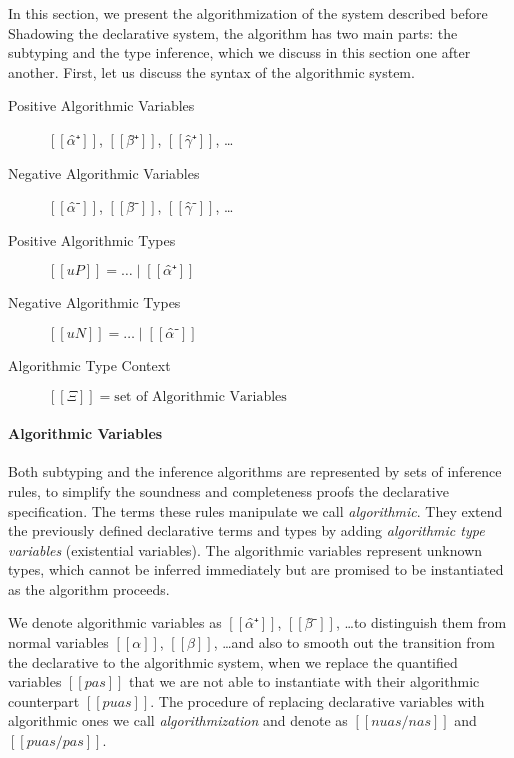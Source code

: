 




In this section, we present the algorithmization of the system described before
Shadowing the declarative system, the algorithm has two main parts: 
the subtyping and the type inference, which we discuss in this section one after another. 
First, let us discuss the syntax of the algorithmic system.

\begin{description}
        \item[Positive Algorithmic Variables] $[[α̂⁺]]$, $[[β̂⁺]]$, $[[γ̂⁺]]$, \dots 
        \item[Negative Algorithmic Variables] $[[α̂⁻]]$, $[[β̂⁻]]$, $[[γ̂⁻]]$, \dots
        \item[Positive Algorithmic Types] $[[uP]] = \dots \mid [[α̂⁺]]$  
        \item[Negative Algorithmic Types] $[[uN]] = \dots \mid [[α̂⁻]]$
        \item[Algorithmic Type Context] $[[Ξ]] = \text{set of Algorithmic Variables}$
\end{description}

\paragraph{Algorithmic Variables}
Both subtyping and the inference algorithms are represented by sets of inference rules, 
to simplify the soundness and completeness proofs \wrt the declarative specification. 
The terms these rules manipulate we call \emph{algorithmic}. They extend the 
previously defined declarative terms and types by adding \emph{algorithmic type variables}
(\aka existential variables). The algorithmic variables represent unknown types, 
which cannot be inferred immediately but are promised to be instantiated
as the algorithm proceeds.

We denote algorithmic variables as $[[α̂⁺]]$, $[[β̂⁻]]$, \dots to distinguish them from
normal variables $[[α]]$, $[[β]]$, \dots and also to smooth out the transition
from the declarative to the algorithmic system, when we replace the quantified variables $[[pas]]$ 
that we are not able to instantiate with their algorithmic counterpart $[[puas]]$.
The procedure of replacing declarative variables with algorithmic ones we call 
\emph{algorithmization} and denote as $[[ nuas/nas ]]$ and $[[ puas/pas ]]$.


